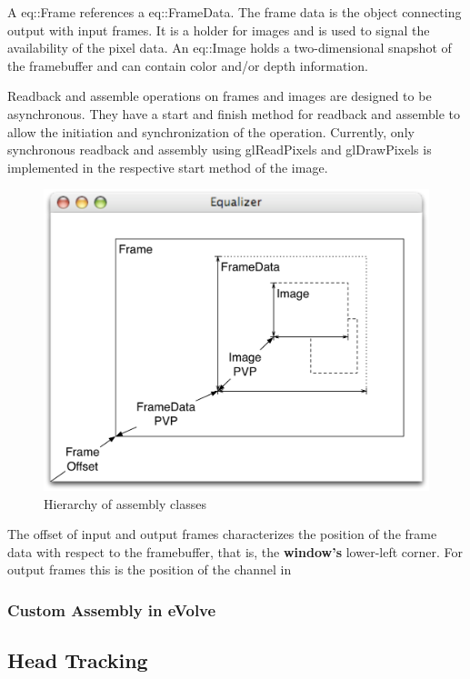 \documentclass[10pt,a4]{scrartcl}
\begin{document}
A \textsf{eq::Frame} references a \textsf{eq::Fra\-me\-Data}. The frame data
is the object connecting output with input frames. It is a holder for
images and is used to signal the availability of the pixel data. An
\textsf{eq::Image} holds a two-dimensional snapshot of the framebuffer
and can contain color and/or depth information.

Readback and assemble operations on frames and images are designed to be
asynchronous. They have a start and finish method for readback and
assemble to allow the initiation and synchronization of the operation.
Currently, only synchronous readback and assembly using
\textsf{glReadPixels} and \textsf{glDrawPixels} is implemented in the
respective start method of the image.


\begin{figure}
  \includegraphics[width=.6\textwidth]{images/assembly.pdf}
  {\caption{\small\label{fAssembly}Hierarchy of assembly classes}}
\end{figure}

The offset of input and output frames characterizes the position of the
frame data with respect to the framebuffer, that is, the
\textbf{window's} lower-left corner. For output frames this is the
position of the channel in 
\fi

\subsubsection{Custom Assembly in eVolve}


\subsection{Head Tracking}
{\footnotesize\begin{lstlisting}
\end{lstlisting}}
\fi
\end{document}
